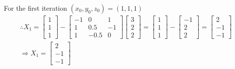 \documentclass{article}
\begin{document}
For the first iteration $(x_{0},y_{0}, z_{0}) = (1,1,1)$
\begin{gather*}
  \therefore X_{1} =
  \begin{bmatrix}
    1\\
    1\\
    1
  \end{bmatrix} -
  \begin{bmatrix}
    -1 & 0 & 1\\
    1 & 0.5 & -1 \\
    1 & -0.5 & 0
  \end{bmatrix}
  \begin{bmatrix}
    3 \\
    2 \\
    2
  \end{bmatrix} =
  \begin{bmatrix}
    1 \\ 1\\ 1
  \end{bmatrix} -
  \begin{bmatrix}
    -1 \\ 2 \\ 2
  \end{bmatrix} =
  \begin{bmatrix}
    2 \\ -1 \\ -1
  \end{bmatrix}\\
  \Rightarrow X_{1} = \begin{bmatrix} 2 \\ -1 \\ -1 \end{bmatrix}
\end{gather*}
\end{document}

